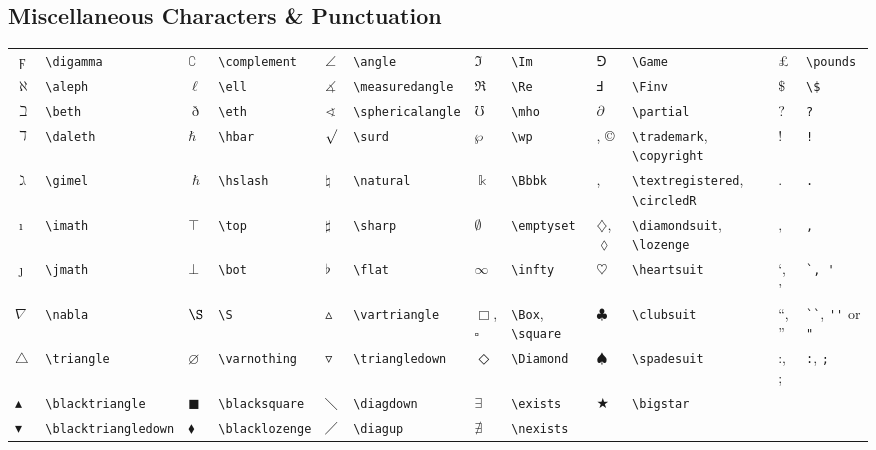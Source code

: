 \documentclass[10pt, english]{article}
\begin{document}
	\subsection{Miscellaneous Characters \& Punctuation}

	\begin{center}
		\scriptsize
	\begin{tabular}{ll|ll|ll|ll|ll|ll}
		$\digamma$ & \verb|\digamma| & $\complement$ & \verb|\complement| & $\angle$ & \verb|\angle| & $\Im$ & \verb|\Im| & $\Game$ & \verb|\Game| & \pounds & \verb|\pounds| \\
		$\aleph$ & \verb|\aleph| & $\ell$ & \verb|\ell| & $\measuredangle$ & \verb|\measuredangle| & $\Re$ & \verb|\Re| & $\Finv$ & \verb|\Finv| & $\$$ & \verb|\$| \\
		$\beth$ & \verb|\beth| & $\eth$ & \verb|\eth| & $\sphericalangle$ & \verb|\sphericalangle| & $\mho$ & \verb|\mho| & $\partial$ & \verb|\partial| & ? & \verb|?| \\
		$\daleth$ & \verb|\daleth| & $\hbar$ & \verb|\hbar| & $\surd$ & \verb|\surd| & $\wp$ & \verb|\wp| & \texttrademark, \copyright & \verb|\trademark|, \verb|\copyright| & ! & \verb|!| \\
		$\gimel$ & \verb|\gimel| & $\hslash$ & \verb|\hslash| & $\natural$ & \verb|\natural| & $\Bbbk$ & \verb|\Bbbk| & \textregistered, \circledR & \verb|\textregistered|, \verb|\circledR| & . & \verb|.| \\
		$\imath$ & \verb|\imath| & $\top$ & \verb|\top| & $\sharp$ & \verb|\sharp| & $\emptyset$ & \verb|\emptyset| & $\diamondsuit$, $\lozenge$ & \verb|\diamondsuit|, \verb|\lozenge| & $,$ & \verb|,| \\
		$\jmath$ & \verb|\jmath| & $\bot$ & \verb|\bot| & $\flat$ & \verb|\flat| & $\infty$ & \verb|\infty| & $\heartsuit$ & \verb|\heartsuit| & `, ' & \verb|`, '| \\
		$\nabla$ & \verb|\nabla| & $\S$ & \verb|\S| & $\vartriangle$ & \verb|\vartriangle| & $\Box$, $\square$ & \verb|\Box|, \verb|\square| & $\clubsuit$ & \verb|\clubsuit| & ``, '' & \verb|``|, \verb|''| or \verb|"| \\
		$\triangle$ & \verb|\triangle| & $\varnothing$ & \verb|\varnothing| & $\triangledown$ & \verb|\triangledown| & $\Diamond$ & \verb|\Diamond| & $\spadesuit$ & \verb|\spadesuit| & :, ; & \verb|:|, \verb|;| \\
		$\blacktriangle$ & \verb|\blacktriangle| & $\blacksquare$ & \verb|\blacksquare| & $\diagdown$ & \verb|\diagdown| & $\exists$ & \verb|\exists| & $\bigstar$ & \verb|\bigstar| \\
		$\blacktriangledown$ & \verb|\blacktriangledown| & $\blacklozenge$ & \verb|\blacklozenge| & $\diagup$ & \verb|\diagup| & $\nexists$ & \verb|\nexists| \\
	\end{tabular}
	\end{center}
\end{document}
